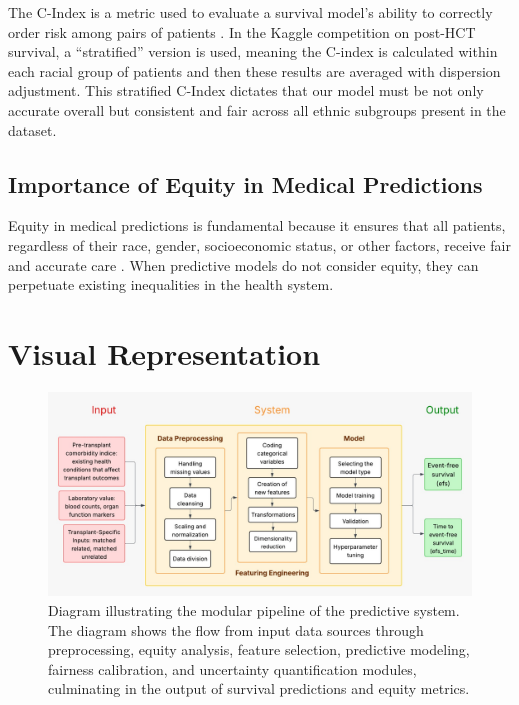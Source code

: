 The C-Index is a metric used to evaluate a survival model's ability to correctly order risk among pairs of patients \cite{kaggle_competition}. In the Kaggle competition on post-HCT survival, a ``stratified'' version is used, meaning the C-index is calculated within each racial group of patients and then these results are averaged with dispersion adjustment. This stratified C-Index dictates that our model must be not only accurate overall but consistent and fair across all ethnic subgroups present in the dataset.

\subsection{Importance of Equity in Medical Predictions}

Equity in medical predictions is fundamental because it ensures that all patients, regardless of their race, gender, socioeconomic status, or other factors, receive fair and accurate care \cite{jama_ai_medicine}. When predictive models do not consider equity, they can perpetuate existing inequalities in the health system.

\section{Visual Representation}

\begin{figure}[htbp]
    \centering
    \includegraphics[width=1\textwidth]{figures/SystemDiagram.jpg}
    \caption{Diagram illustrating the modular pipeline of the predictive system. The diagram shows the flow from input data sources through preprocessing, equity analysis, feature selection, predictive modeling, fairness calibration, and uncertainty quantification modules, culminating in the output of survival predictions and equity metrics.}
    \label{fig:system_architecture}
\end{figure}

